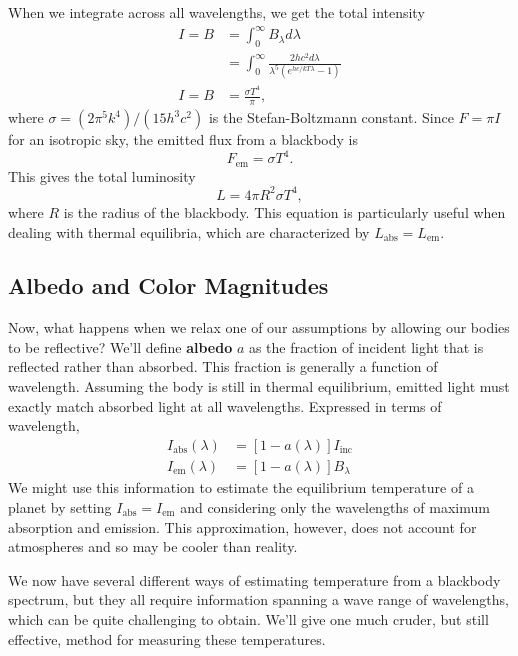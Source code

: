 \documentclass[../a062main.tex]{subfiles}
\begin{document}
When we integrate across all wavelengths, we get the total intensity
\begin{align*}
    I = B &= \int_{0}^{\infty} B_\lambda d\lambda \\
    &= \int_{0}^{\infty} \frac{2hc^2 d\lambda}{\lambda^{5} (e^{hc/kT\lambda} - 1)} \\
    I = B &= \frac{\sigma T^{4}}{\pi},
\end{align*}
where $\sigma = (2\pi^{5} k^{4}) / (15h^{3} c^2)$ is the Stefan-Boltzmann constant.
Since $F = \pi I$ for an isotropic sky, the emitted flux from a blackbody is
\[ \boxed{F_\textrm{em} = \sigma T^{4}}. \]
This gives the total luminosity
\[ \boxed{L = 4\pi R^2 \sigma T^{4}}, \]
where $R$ is the radius of the blackbody.
This equation is particularly useful when dealing with thermal equilibria, which are characterized by $L_\textrm{abs} = L_\textrm{em}$.

\subsection*{Albedo and Color Magnitudes}
Now, what happens when we relax one of our assumptions by allowing our bodies to be reflective?
We'll define \textbf{albedo} $a$ as the fraction of incident light that is reflected rather than absorbed.
This fraction is generally a function of wavelength.
Assuming the body is still in thermal equilibrium, emitted light must exactly match absorbed light at all wavelengths.
Expressed in terms of wavelength,
\begin{align*}
    I_\textrm{abs}(\lambda) &= \left[ 1 - a(\lambda) \right] I_\textrm{inc} \\
    I_\textrm{em}(\lambda) &= \left[ 1 - a(\lambda) \right] B_\lambda
\end{align*}
We might use this information to estimate the equilibrium temperature of a planet by setting $I_\textrm{abs} = I_\textrm{em}$ and considering only the wavelengths of maximum absorption and emission.
This approximation, however, does not account for atmospheres and so may be cooler than reality.

We now have several different ways of estimating temperature from a blackbody spectrum, but they all require information spanning a wave range of wavelengths, which can be quite challenging to obtain.
We'll give one much cruder, but still effective, method for measuring these temperatures.
\end{document}
